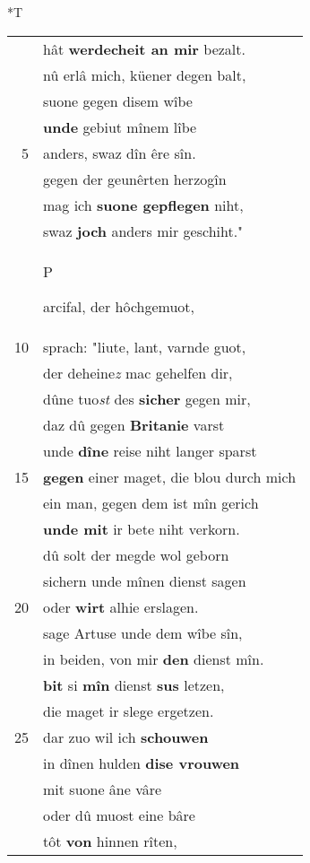 \documentclass[8pt,a4paper,notitlepage]{article}
\begin{document}
\begin{table}[ht]
\begin{minipage}[t]{0.5\linewidth}
\small
\begin{center}*T
\end{center}
\begin{tabular}{rl}
 & hât \textbf{werdecheit an mir} bezalt.\\ 
 & nû erlâ mich, küener degen balt,\\ 
 & suone gegen disem wîbe\\ 
 & \textbf{unde} gebiut mînem lîbe\\ 
5 & anders, swaz dîn êre sîn.\\ 
 & gegen der geunêrten herzogîn\\ 
 & mag ich \textbf{suone gepflegen} niht,\\ 
 & swaz \textbf{joch} anders mir geschiht."\\ 
 & \begin{large}P\end{large}arcifal, der hôchgemuot,\\ 
10 & sprach: "liute, lant, varnde guot,\\ 
 & der deheine\textit{z} mac gehelfen dir,\\ 
 & dûne tuo\textit{st} des \textbf{sicher} gegen mir,\\ 
 & daz dû gegen \textbf{Britanie} varst\\ 
 & unde \textbf{dîne} reise niht langer sparst\\ 
15 & \textbf{gegen} einer maget, die blou durch mich\\ 
 & ein man, gegen dem ist mîn gerich\\ 
 & \textbf{unde mit} ir bete niht verkorn.\\ 
 & dû solt der megde wol geborn\\ 
 & sichern unde mînen dienst sagen\\ 
20 & oder \textbf{wirt} alhie erslagen.\\ 
 & sage Artuse unde dem wîbe sîn,\\ 
 & in beiden, von mir \textbf{den} dienst mîn.\\ 
 & \textbf{bit} si \textbf{mîn} dienst \textbf{sus} letzen,\\ 
 & die maget ir slege ergetzen.\\ 
25 & dar zuo wil ich \textbf{schouwen}\\ 
 & in dînen hulden \textbf{dise vrouwen}\\ 
 & mit suone âne vâre\\ 
 & oder dû muost eine bâre\\ 
 & tôt \textbf{von} hinnen rîten,\\ 

\end{tabular}
\end{minipage}
\end{table}
\end{document}
